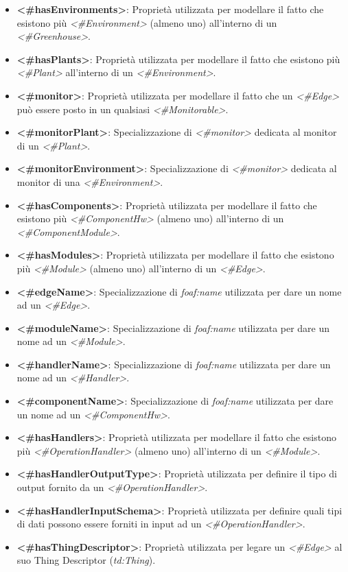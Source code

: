 \begin{itemize}
	\item \textbf{<\#hasEnvironments>}: Proprietà utilizzata per modellare il fatto che esistono più \textit{<\#Environment>} (almeno uno) all'interno di un \textit{<\#Greenhouse>}.
	\item \textbf{<\#hasPlants>}: Proprietà utilizzata per modellare il fatto che esistono più \textit{<\#Plant>} all'interno di un \textit{<\#Environment>}.
	\item \textbf{<\#monitor>}: Proprietà utilizzata per modellare il fatto che un \textit{<\#Edge>} può essere posto in un qualsiasi \textit{<\#Monitorable>}.
	\item \textbf{<\#monitorPlant>}: Specializzazione di \textit{<\#monitor>} dedicata al monitor di un \textit{<\#Plant>}.
	\item \textbf{<\#monitorEnvironment>}: Specializzazione di \textit{<\#monitor>} dedicata al monitor di una \textit{<\#Environment>}.
	\item \textbf{<\#hasComponents>}: Proprietà utilizzata per modellare il fatto che esistono più \textit{<\#ComponentHw>} (almeno uno) all'interno di un \textit{<\#ComponentModule>}.
	\item \textbf{<\#hasModules>}: Proprietà utilizzata per modellare il fatto che esistono più \textit{<\#Module>} (almeno uno) all'interno di un \textit{<\#Edge>}.
	\item \textbf{<\#edgeName>}: Specializzazione di \textit{foaf:name} utilizzata per dare un nome ad un \textit{<\#Edge>}.
	\item \textbf{<\#moduleName>}: Specializzazione di \textit{foaf:name} utilizzata per dare un nome ad un \textit{<\#Module>}.
	\item \textbf{<\#handlerName>}: Specializzazione di \textit{foaf:name} utilizzata per dare un nome ad un \textit{<\#Handler>}.
	\item \textbf{<\#componentName>}: Specializzazione di \textit{foaf:name} utilizzata per dare un nome ad un \textit{<\#ComponentHw>}.
	\item \textbf{<\#hasHandlers>}: Proprietà utilizzata per modellare il fatto che esistono più \textit{<\#OperationHandler>} (almeno uno) all'interno di un \textit{<\#Module>}.
	\item \textbf{<\#hasHandlerOutputType>}: Proprietà utilizzata per definire il tipo di output fornito da un \textit{<\#OperationHandler>}.
	\item \textbf{<\#hasHandlerInputSchema>}: Proprietà utilizzata per definire quali tipi di dati possono essere forniti in input ad un \textit{<\#OperationHandler>}.
	\item \textbf{<\#hasThingDescriptor>}: Proprietà utilizzata per legare un \textit{<\#Edge>} al suo Thing Descriptor (\textit{td:Thing}).
\end{itemize}

